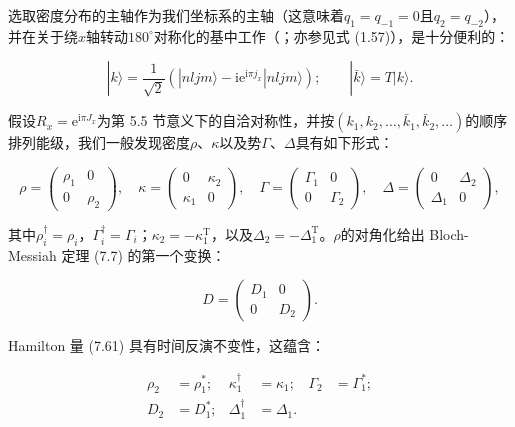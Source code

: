 选取密度分布的主轴作为我们坐标系的主轴（这意味着$q_{1}=q_{-1}=0$且$q_{2}=q_{-2}$），并在关于绕$x$轴转动$180^{\circ}$对称化的基中工作（\cite{RBM70,Go74}；亦参见式
(1.57)），是十分便利的：

\begin{equation}
|k\rangle=\frac{1}{\sqrt{2}}(|nljm\rangle-\mathrm{i}\mathrm{e}^{\mathrm{i}\pi j_{x}}|nljm\rangle);\qquad|\bar{k}\rangle=T|k\rangle.\label{eq:symmetrized_basis_ppq}
\end{equation}

假设$R_{x}=\mathrm{e}^{\mathrm{i}\pi J_{x}}$为第 5.5 节意义下的自洽对称性，并按$(k_{1},k_{2},\dots,\bar{k}_{1},\bar{k}_{2},\dots)$的顺序排列能级，我们一般发现密度$\rho$、$\kappa$以及势$\Gamma$、$\Delta$具有如下形式：

\begin{equation}
\rho=\begin{pmatrix}\rho_{1} & 0\\
0 & \rho_{2}
\end{pmatrix},\quad\kappa=\begin{pmatrix}0 & \kappa_{2}\\
\kappa_{1} & 0
\end{pmatrix},\quad\Gamma=\begin{pmatrix}\Gamma_{1} & 0\\
0 & \Gamma_{2}
\end{pmatrix},\quad\Delta=\begin{pmatrix}0 & \Delta_{2}\\
\Delta_{1} & 0
\end{pmatrix},\label{eq:block_form_ppq}
\end{equation}

其中$\rho^{\dagger}_{i}=\rho_{i}$，$\Gamma^{\dagger}_{i}=\Gamma_{i}$；$\kappa_{2}=-\kappa^{\mathrm{T}}_{1}$，以及$\Delta_{2}=-\Delta^{\mathrm{T}}_{1}$。$\rho$的对角化给出
Bloch-Messiah 定理 (7.7) 的第一个变换：

\begin{equation}
D=\begin{pmatrix}D_{1} & 0\\
0 & D_{2}
\end{pmatrix}.\label{eq:d_first_bm_transformation}
\end{equation}

Hamilton 量 (7.61) 具有时间反演不变性，这蕴含：

\begin{align}
\rho_{2} & =\rho^{*}_{1}; & \kappa^{\dagger}_{1} & =\kappa_{1}; & \Gamma_{2} & =\Gamma^{*}_{1};\nonumber \\
D_{2} & =D^{*}_{1}; & \Delta^{\dagger}_{1} & =\Delta_{1}.\label{eq:time_reversal_relations_ppq}
\end{align}

